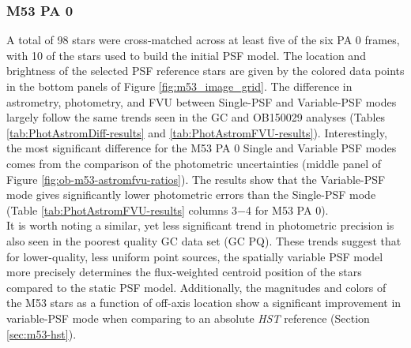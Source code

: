 \documentclass[]{spie}  %
\begin{document}
\subsubsection{M53 PA 0} \label{sec:result-m53-pa0}
A total of 98 stars were cross-matched across at least five of the six PA 0 frames, with 10 of the stars used to build the initial PSF model. The location and brightness of the selected PSF reference stars are given by the colored data points in the bottom panels of Figure \ref{fig:m53_image_grid}. The difference in astrometry, photometry, and FVU between Single-PSF and Variable-PSF modes largely follow the same trends seen in the GC and OB150029 analyses (Tables \ref{tab:PhotAstromDiff-results} and \ref{tab:PhotAstromFVU-results}). Interestingly, the most significant difference for the M53 PA 0 Single and Variable PSF modes comes from the comparison of the photometric uncertainties (middle panel of Figure \ref{fig:ob-m53-astromfvu-ratios}). The results show that the Variable-PSF mode gives significantly lower photometric errors than the Single-PSF mode (Table \ref{tab:PhotAstromFVU-results} columns 3$-$4 for M53 PA 0). \\
\indent It is worth noting a similar, yet less significant trend in photometric precision is also seen in the poorest quality GC data set (GC PQ). These trends suggest that for lower-quality, less uniform point sources, the spatially variable PSF model more precisely determines the flux-weighted centroid position of the stars compared to the static PSF model. Additionally, the magnitudes and colors of the M53 stars as a function of off-axis location show a significant improvement in variable-PSF mode when comparing to an absolute \textit{HST} reference (Section \ref{sec:m53-hst}).
\end{document}
